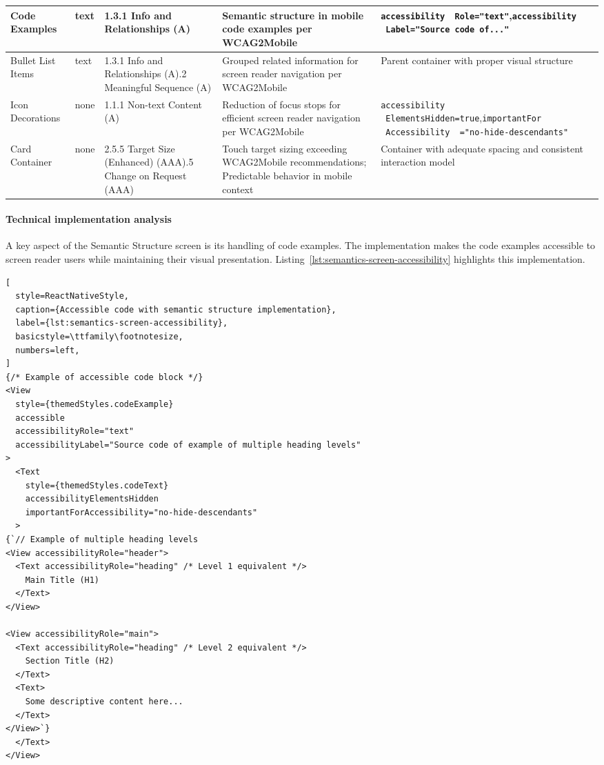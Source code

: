 \begin{longtable}[c]{|C{2.5cm}|C{2cm}|C{2.8cm}|C{3.5cm}|C{4.7cm}|}
\hline
Code Examples & text & 1.3.1 Info and Relationships (A) & Semantic structure in mobile code examples per WCAG2Mobile & \texttt{accessibility \ Role="text"},\newline \texttt{accessibility \ Label="Source code of..."} \\
\hline
Bullet List Items & text & 1.3.1 Info and Relationships (A).2 Meaningful Sequence (A) & Grouped related information for screen reader navigation per WCAG2Mobile & Parent container with proper visual structure \\
\hline
Icon Decorations & none & 1.1.1 Non-text Content (A) & Reduction of focus stops for efficient screen reader navigation per WCAG2Mobile & \texttt{accessibility \ ElementsHidden=true},\newline \texttt{importantFor \ Accessibility \ ="no-hide-descendants"} \\
\hline
Card Container & none & 2.5.5 Target Size (Enhanced) (AAA).5 Change on Request (AAA) & Touch target sizing exceeding WCAG2Mobile recommendations; Predictable behavior in mobile context & Container with adequate spacing and consistent interaction model \\
\hline
\end{longtable}
\FloatBarrier

\paragraph{Technical implementation analysis}

A key aspect of the Semantic Structure screen is its handling of code examples. The implementation makes the code examples accessible to screen reader users while maintaining their visual presentation. Listing~\ref{lst:semantics-screen-accessibility} highlights this implementation.

\begin{lstlisting}[
  style=ReactNativeStyle,
  caption={Accessible code with semantic structure implementation},
  label={lst:semantics-screen-accessibility},
  basicstyle=\ttfamily\footnotesize,
  numbers=left,
]
{/* Example of accessible code block */}
<View
  style={themedStyles.codeExample}
  accessible
  accessibilityRole="text"
  accessibilityLabel="Source code of example of multiple heading levels"
>
  <Text
    style={themedStyles.codeText}
    accessibilityElementsHidden
    importantForAccessibility="no-hide-descendants"
  >
{`// Example of multiple heading levels
<View accessibilityRole="header">
  <Text accessibilityRole="heading" /* Level 1 equivalent */>
    Main Title (H1)
  </Text>
</View>

<View accessibilityRole="main">
  <Text accessibilityRole="heading" /* Level 2 equivalent */>
    Section Title (H2)
  </Text>
  <Text>
    Some descriptive content here...
  </Text>
</View>`}
  </Text>
</View>
\end{lstlisting}
\FloatBarrier

